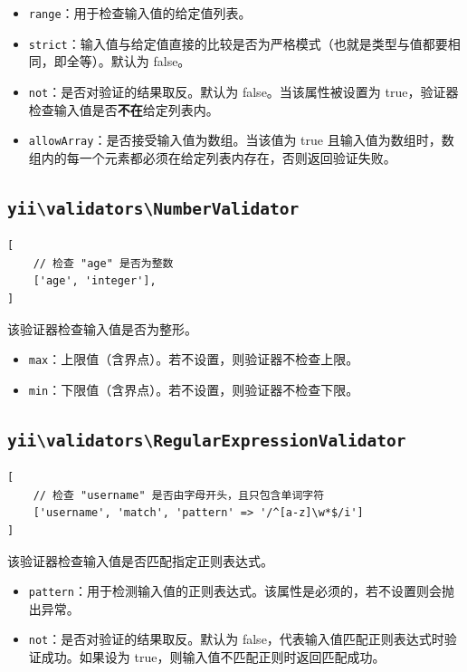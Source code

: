 \begin{itemize}
\item \lstinline|range|：用于检查输入值的给定值列表。
\item \lstinline|strict|：输入值与给定值直接的比较是否为严格模式（也就是类型与值都要相同，即全等）。默认为 false。
\item \lstinline|not|：是否对验证的结果取反。默认为 false。当该属性被设置为 true，验证器检查输入值是否\textbf{不在}给定列表内。
\item \lstinline|allowArray|：是否接受输入值为数组。当该值为 true 且输入值为数组时，数组内的每一个元素都必须在给定列表内存在，否则返回验证失败。
\end{itemize}
\subsection{\texttt{yii{\allowbreak{}\textbackslash}validators{\allowbreak{}\textbackslash}NumberValidator} \label{tutorial-core-validators.md::integer}}
\lstset{language=php}\begin{lstlisting}
[
    // 检查 "age" 是否为整数
    ['age', 'integer'],
]
\end{lstlisting}
该验证器检查输入值是否为整形。

\begin{itemize}
\item \lstinline|max|：上限值（含界点）。若不设置，则验证器不检查上限。
\item \lstinline|min|：下限值（含界点）。若不设置，则验证器不检查下限。
\end{itemize}
\subsection{\texttt{yii{\allowbreak{}\textbackslash}validators{\allowbreak{}\textbackslash}RegularExpressionValidator} \label{tutorial-core-validators.md::match}}
\lstset{language=php}\begin{lstlisting}
[
    // 检查 "username" 是否由字母开头，且只包含单词字符
    ['username', 'match', 'pattern' => '/^[a-z]\w*$/i']
]
\end{lstlisting}
该验证器检查输入值是否匹配指定正则表达式。

\begin{itemize}
\item \lstinline|pattern|：用于检测输入值的正则表达式。该属性是必须的，若不设置则会抛出异常。
\item \lstinline|not|：是否对验证的结果取反。默认为 false，代表输入值匹配正则表达式时验证成功。如果设为 true，则输入值不匹配正则时返回匹配成功。
\end{itemize}
